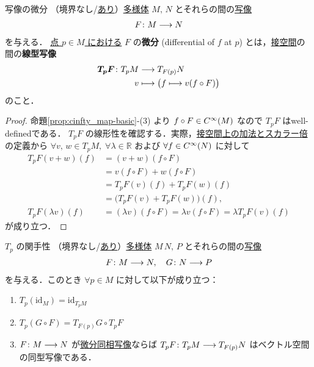 \documentclass[geometry_main]{subfiles}
\begin{document}
\begin{mydef}[label=def:functor-Tp]{\cinfty 写像の微分}
	（境界なし/\hyperref[def:mani-with-boundary]{あり}）\hyperref[diffmani]{\cinfty 多様体} $M,\, N$ とそれらの間の\hyperref[def.cinfty_mapping]{\cinfty 写像}
	\begin{align}
		F \colon M \longrightarrow N
	\end{align}
	を与える．
	\underline{点 $p \in M$ における} $F$ の\textbf{微分} (differential of $f$ at $p$) とは，\hyperref[def.tangentv]{接空間}の間の\textbf{線型写像}
	\begin{align}
		\bm{T_p F} \colon T_p M &\longrightarrow T_{F(p)} N \\
		v &\longmapsto \bigl( f \longmapsto v(f \circ F) \bigr) 
	\end{align}
	のこと．
\end{mydef}

\begin{proof}
	命題\ref{prop:cinfty_map-basic}-(3) より $f \circ F \in C^\infty(M)$ なので $T_p F$ はwell-definedである．
	$T_p F$ の線形性を確認する．実際，\hyperref[def.op_tangentv]{接空間上の加法とスカラー倍}の定義から $\forall v,\, w \in T_p M,\; \forall \lambda \in \mathbb{R}$ および $\forall f \in C^\infty(N)$ に対して
	\begin{align}
		T_p F(v+w)(f) &= (v+w)(f \circ F) \\
		&= v(f\circ F) + w(f\circ F) \\
		&= T_p F(v)(f) + T_p F(w)(f) \\
		&= \bigl( T_p F(v) + T_p F(w) \bigr) (f), \\
		T_p F(\lambda v)(f) &= (\lambda v)(f \circ F) = \lambda v(f \circ F) = \lambda T_p F(v)(f)
	\end{align}
	が成り立つ．
\end{proof}


\begin{myprop}[label=prop:functor-Tp]{$T_p$ の関手性}
	（境界なし/\hyperref[def:mani-with-boundary]{あり}）\hyperref[diffmani]{\cinfty 多様体} $M\, N,\, P$ とそれらの間の\hyperref[def.cinfty_mapping]{\cinfty 写像}
	\begin{align}
		F \colon M \longrightarrow N,\quad G \colon N \longrightarrow P
	\end{align}
	を与える．このとき $\forall p \in M$ に対して以下が成り立つ：
	\begin{enumerate}
		\item $T_p (\mathrm{id}_M) = \mathrm{id}_{T_p M}$
		\item $T_p (G \circ F) = T_{F(p)} G \circ T_p F$
		\item $F \colon M \longrightarrow N$ が\hyperref[def.diff]{微分同相写像}ならば $T_p F \colon T_p M \longrightarrow T_{F(p)} N$ はベクトル空間の同型写像である．
	\end{enumerate}
\end{myprop}
\end{document}
